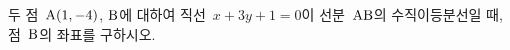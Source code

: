두 점~$\mathrm{A}(1{,}\mkern3mu\mathopen{}-4)$, $\mathrm{B}$에 대하여 직선~$x+3y+1=0$이 선분~$\mathrm{AB}$의 수직이등분선일 때, 점~$\mathrm{B}$의 좌표를 구하시오.

